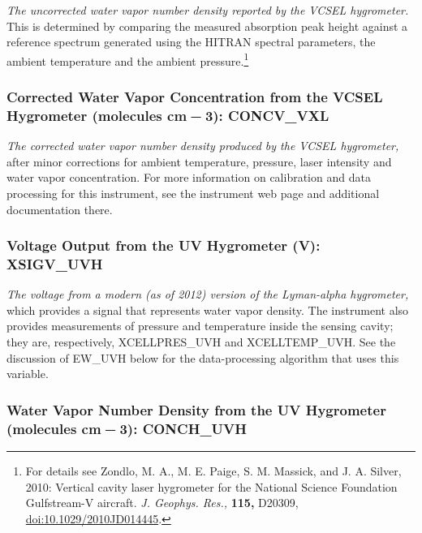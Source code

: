 \documentclass[
  english,
]{book}
\begin{document}
\emph{The uncorrected water vapor number density reported by the VCSEL
hygrometer.} This is determined by comparing the measured absorption
peak height against a reference spectrum generated using the HITRAN
spectral parameters, the ambient temperature and the ambient
pressure.\footnote{For details see Zondlo, M. A., M. E. Paige, S. M.
  Massick, and J. A. Silver, 2010: Vertical cavity laser hygrometer for
  the National Science Foundation Gulfstream-V aircraft. \emph{J.
  Geophys. Res.,} \textbf{115,} D20309, \url{doi:10.1029/2010JD014445}.}

\hypertarget{vcsel-corr}{%
\subsubsection*{\texorpdfstring{Corrected Water Vapor Concentration from
the VCSEL Hygrometer (molecules cm{ − 3}):
CONCV\_VXL}{Corrected Water Vapor Concentration from the VCSEL Hygrometer (molecules cm − 3): CONCV\_VXL}}\label{vcsel-corr}}

\emph{The corrected water vapor number density produced by the VCSEL
hygrometer,} after minor corrections for ambient temperature, pressure,
laser intensity and water vapor concentration. For more information on
calibration and data processing for this instrument, see the instrument
web page and additional documentation there.

\hypertarget{uvh-voltage}{%
\subsubsection*{Voltage Output from the UV Hygrometer (V):
XSIGV\_UVH}\label{uvh-voltage}}

\emph{The voltage from a modern (as of 2012) version of the Lyman-alpha
hygrometer,} which provides a signal that represents water vapor
density. The instrument also provides measurements of pressure and
temperature inside the sensing cavity; they are, respectively,
XCELLPRES\_UVH and XCELLTEMP\_UVH. See the discussion of EW\_UVH below
for the data-processing algorithm that uses this variable.

\hypertarget{uvh-n}{%
\subsubsection*{\texorpdfstring{Water Vapor Number Density from the UV
Hygrometer (molecules cm{ − 3}):
CONCH\_UVH}{Water Vapor Number Density from the UV Hygrometer (molecules cm − 3): CONCH\_UVH}}\label{uvh-n}}
\end{document}
